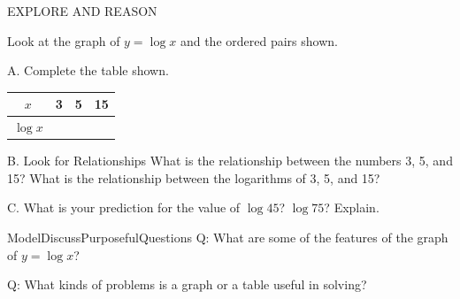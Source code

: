 \documentclass{article}
\newenvironment{model-discuss}{}{}      %
\newenvironment{te-addendum}[2]{}{}     %
\newcommand{\answer}[1]{}               %
\begin{document}
\begin{model-discuss}
EXPLORE AND REASON

Look at the graph of $y=\log x$ and the ordered pairs shown.


A. Complete the table shown.

\begin{tabular}{c|ccc}
$x$ & 3 & 5 & 15 \\
\hline
$\log x$ & & & \\
\end{tabular}

B. Look for Relationships What is the relationship between the numbers 3, 5, and 15? What is the relationship between the logarithms of 3, 5, and 15?

C. What is your prediction for the value of $\log 45$? $\log 75$? Explain.

\answer{A. \(\begin{array}{c|ccc}x&3&5&15\\\hline \log x&0.477&0.699&1.176\end{array}\) B. \(3\times5=15\), so 3 and 5 are both factors of 15. \(0.477+0.699=1.176\), so \(\log3+\log5=\log15\). C. I know that \(45=3\times15\), so \(\log45\) is the same as \(\log3+\log15\), meaning the value of \(\log45\) is 1.653. And \(75=5\times15\), so \(\log75=\log5+\log15\), or about 1.875.}
\end{model-discuss}

\begin{te-addendum}{ModelDiscuss}{PurposefulQuestions}
Q: What are some of the features of the graph of $y=\log x$?
\answer{The graph has an $x$-intercept at 1 and vertical asymptote at the $y$-axis.}
Q: What kinds of problems is a graph or a table useful in solving?
\answer{Sample: problems that require you to find a pattern.}
\end{te-addendum}
\end{document}
